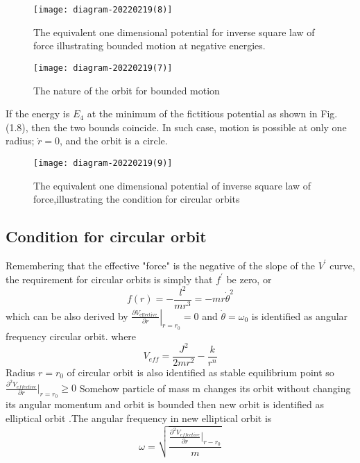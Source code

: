 \begin{minipage}{0.5\textwidth}
	\begin{figure}[H]
		\centering
		\texttt{[image: diagram-20220219(8)]}
		\caption{The equivalent one dimensional potential for inverse square law of force illustrating bounded motion at negative energies.}
		\label{}
	\end{figure}
\end{minipage}
\begin{minipage}{0.5\textwidth}
\begin{figure}[H]
	\centering
	\texttt{[image: diagram-20220219(7)]}
	\caption{The nature of the orbit for bounded motion}
	\label{}
\end{figure}
\end{minipage}
\par If the energy is $E_{4}$ at the minimum of the fictitious potential as shown in Fig. (1.8), then the two bounds coincide. In such case, motion is possible at only one radius; $\dot{r}=0$, and the orbit is a circle.
\begin{figure}[H]
	\centering
	\texttt{[image: diagram-20220219(9)]}
	\caption{The equivalent one dimensional potential of inverse square law of force,illustrating the condition for circular orbits}
	\label{}
\end{figure}
\subsection{Condition for circular orbit}
Remembering that the effective "force" is the negative of the slope of the $V^{\prime}$ curve, the requirement for circular orbits is simply that $f^{\prime}$ be zero, or
$$
f(r)=-\frac{l^{2}}{m r^{3}}=-m r \dot{\theta}^{2}
$$
which can be also derived by $\left.\frac{\partial V_{\text {effective }}}{\partial r}\right|_{r=r_{0}}=0$ and $\dot{\theta}=\omega_{0}$ is identified as angular frequency circular orbit.	
where $$V_{e f f}=\frac{J^{2}}{2 m r^{2}}-\frac{k}{r^{n}}$$
Radius $r=r_0$ of circular orbit is also identified as stable equilibrium point so $\frac{\partial^2V_{effective}}{\partial r}|_{r=r_0}\geq 0$
Somehow particle of mass m changes its orbit without changing its angular momentum and orbit is bounded then new orbit is identified as elliptical orbit .The angular frequency in new elliptical orbit is 
$$\omega=\sqrt{\frac{\frac{\partial^2 V_{effective}}{\partial r}|_{r-r_0}}{m}}$$

